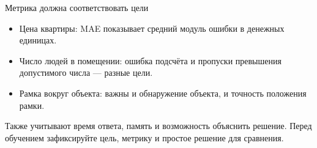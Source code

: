 \begin{frame}{Метрика должна соответствовать цели}
  \begin{itemize}
    \item Цена квартиры: MAE показывает средний модуль ошибки в денежных единицах.
    \item Число людей в помещении: ошибка подсчёта и пропуски превышения допустимого числа --- разные цели.
    \item Рамка вокруг объекта: важны и обнаружение объекта, и точность положения рамки.
  \end{itemize}
  \medskip
  Также учитывают время ответа, память и возможность объяснить решение.
  \medskip
  Перед обучением зафиксируйте цель, метрику и простое решение для сравнения.
\end{frame}

